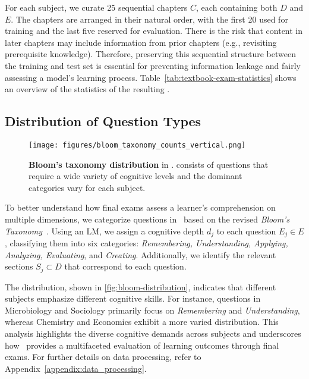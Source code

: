 For each subject, we curate 25 sequential chapters \(C\), each containing both \(D\) and \(E\).
The chapters are arranged in their natural order, with the first 20 used for training and the last five reserved for evaluation.  
There is the risk that content in later chapters may include information from prior chapters (e.g., revisiting prerequisite knowledge). 
Therefore, preserving this sequential structure between the training and test set is essential for preventing information leakage and fairly assessing a model's learning process.
Table~\ref{tab:textbook-exam-statistics} shows an overview of the statistics of the resulting \ourdata.

\subsection{Distribution of Question Types}
\label{ssec:textbook-exam-bloom}

 \begin{figure}[t]
    \centering
    \texttt{[image: figures/bloom\_taxonomy\_counts\_vertical.png]}
    \caption{\textbf{Bloom's taxonomy distribution} in \ourdata. \ourdata consists of questions that require a wide variety of cognitive levels and the dominant categories vary for each subject.}
    \label{fig:bloom-distribution}
\end{figure}

To better understand how final exams assess a learner’s comprehension on multiple dimensions, we categorize questions in \ourdata\ based on the revised \textit{Bloom’s Taxonomy}~\cite{krathwohl2002revision_bloom}. 
Using an LM, we assign a cognitive depth \( d_j \) to each question \( E_j \in E \), classifying them into six categories: \textit{Remembering, Understanding, Applying, Analyzing, Evaluating}, and \textit{Creating}.
Additionally, we identify the relevant sections \( S_j \subset D \) that correspond to each question.

The distribution, shown in \autoref{fig:bloom-distribution}, indicates that different subjects emphasize different cognitive skills.
For instance, questions in Microbiology and Sociology primarily focus on \textit{Remembering} and \textit{Understanding}, whereas Chemistry and Economics exhibit a more varied distribution.
This analysis highlights the diverse cognitive demands across subjects and underscores how \ourdata\ provides a multifaceted evaluation of learning outcomes through final exams. 
For further details on data processing, refer to Appendix~\ref{appendix:data_processing}.













